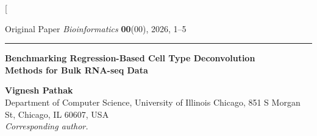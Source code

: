 \documentclass[10pt,twocolumn]{article}
\begin{document}
\twocolumn[{%
\begin{@twocolumnfalse}

\vspace*{6pt}
{\noindent\small Original Paper \hfill \textit{Bioinformatics} \textbf{00}(00), 2026, 1--5
\par\vspace{4pt}\hrule\vspace{10pt}}

{\noindent\LARGE\bfseries
  Benchmarking Regression-Based Cell Type Deconvolution\\[4pt]
  Methods for Bulk RNA-seq Data
\par}

\vspace{8pt}

{\noindent\normalsize
  \textbf{Vignesh Pathak}\\[2pt]
  Department of Computer Science, University of Illinois Chicago,
  851 S Morgan St, Chicago, IL 60607, USA\\[2pt]
  \textit{Corresponding author.}
\par}

\vspace{8pt}

\begin{abstract}
\noindent\textbf{Motivation:}
Determining cell type composition from bulk RNA-seq data is fundamental
to computational biology, with direct applications in cancer immunology and
disease characterisation. Reference-based deconvolution frames this as a
regression problem: given an observed bulk expression vector and a reference
signature matrix, recover non-negative cell type proportions. Widely-used
tools such as CIBERSORTx and MuSiC embed specific regression engines as
black boxes, yet it remains unclear whether the regression algorithm
materially affects accuracy or whether upstream factors such as signature
matrix quality and gene selection dominate performance.

\medskip\noindent\textbf{Results:}
We benchmarked three algorithms---Non-Negative Least Squares (NNLS), Support
Vector Regression (SVR), and Robust Regression via Huber loss---on synthetic
pseudo-bulk mixtures from 8 immune cell types using GEO dataset GSE107011.
All three methods achieve strong accuracy (Pearson $r>0.94$) with differences
of $\Delta r<0.003$ across methods. NNLS matches or exceeds competing methods
on every accuracy metric, exhibits the greatest noise stability, and is
approximately 3\,000$\times$ faster than SVR. Marker gene selection strategy
and cell type transcriptomic distinctness are larger determinants of
deconvolution quality than the choice of regression algorithm.


\end{abstract}
\end{@twocolumnfalse}}
\end{document}
